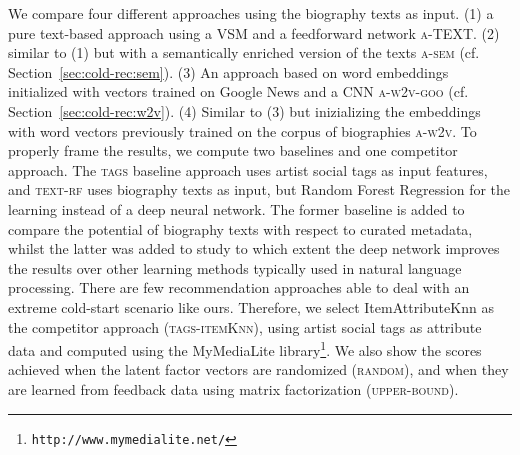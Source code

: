 We compare four different approaches using the biography texts as input. (1) a pure text-based approach using a VSM and a feedforward network \textsc{a-TEXT}. (2) similar to (1) but with a semantically enriched version of the texts \textsc{a-sem} (cf. Section~\ref{sec:cold-rec:sem}). (3) An approach based on word embeddings initialized with vectors trained on Google News and a CNN \textsc{a-w2v-goo} (cf. Section~\ref{sec:cold-rec:w2v}). (4) Similar to (3) but inizializing the embeddings with word vectors previously trained on the corpus of biographies \textsc{a-w2v}. To properly frame the results, we compute two baselines and one competitor approach. The \textsc{tags} baseline approach uses artist social tags as input features, and \textsc{text-rf} uses biography texts as input, but Random Forest Regression for the learning instead of a deep neural network. The former baseline is added to compare the potential of biography texts with respect to curated metadata, whilst the latter was added to study to which extent the deep network improves the results over other learning methods typically used in natural language processing. There are few recommendation approaches able to deal with an extreme cold-start scenario like ours. Therefore, we select ItemAttributeKnn \cite{GantnerDFRS10} as the competitor approach (\textsc{tags-itemKnn}), using artist social tags as attribute data and computed using the MyMediaLite library\footnote{\texttt{http://www.mymedialite.net/}}. %
We also show the scores achieved when the latent factor vectors are randomized (\textsc{random}), and when they are learned from feedback data using matrix factorization (\textsc{upper-bound}).

